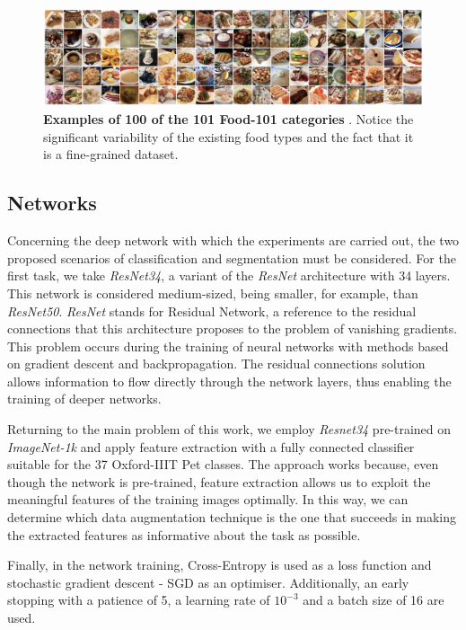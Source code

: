 \begin{figure}
    \centering
    \includegraphics[width=1\textwidth]{Pictures/food101.png} 
    \caption{\textbf{Examples of 100 of the 101 Food-101 categories} \cite{bossard14}. Notice the significant variability of the existing food types and the fact that it is a fine-grained dataset.}
    \label{fig:food101}
\end{figure}

\subsection{Networks}
Concerning the deep network with which the experiments are carried out, the two proposed scenarios of classification and segmentation must be considered. For the first task, we take \textit{ResNet34}, a variant of the \textit{ResNet} architecture \cite{he2016deep} with 34 layers. This network is considered medium-sized, being smaller, for example, than \textit{ResNet50}. \textit{ResNet} stands for Residual Network, a reference to the residual connections that this architecture proposes to the problem of vanishing gradients. This problem occurs during the training of neural networks with methods based on gradient descent and backpropagation. The residual connections solution allows information to flow directly through the network layers, thus enabling the training of deeper networks. 

Returning to the main problem of this work, we employ \textit{Resnet34} pre-trained on \textit{ImageNet-1k} and apply feature extraction with a fully connected classifier suitable for the 37 Oxford-IIIT Pet classes. The approach works because, even though the network is pre-trained, feature extraction allows us to exploit the meaningful features of the training images optimally. In this way, we can determine which data augmentation technique is the one that succeeds in making the extracted features as informative about the task as possible.

Finally, in the network training, Cross-Entropy is used as a loss function and stochastic gradient descent - SGD as an optimiser. Additionally, an early stopping with a patience of 5, a learning rate of $10^{-3}$ and a batch size of 16 are used.

